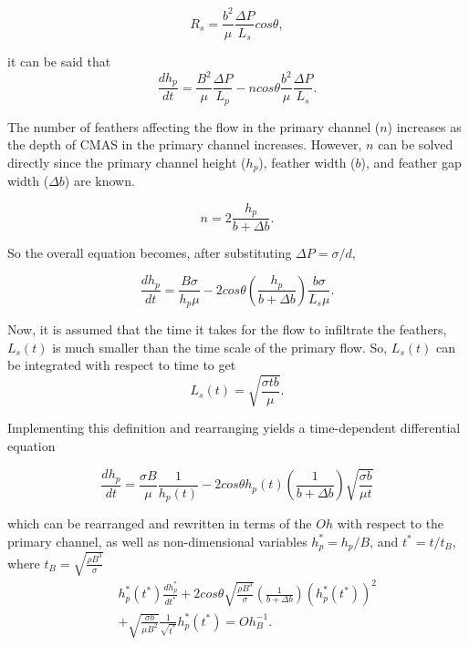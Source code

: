 \documentclass[%
 aip,
 amsmath,amssymb,
 reprint,%
floatfix]{revtex4-1}
\begin{document}
\begin{equation}
    R_{s} = \frac{b^{2}}{\mu}\frac{\Delta P}{L_{s}}cos\theta,
\end{equation}

\noindent it can be said that 
\begin{equation}
        \frac{dh_{p}}{dt} = \frac{B^{2}}{\mu}\frac{\Delta P}{L_{p}} -ncos\theta\frac{b^{2}}{\mu}\frac{\Delta P}{L_{s}}.
\end{equation}

\noindent The number of feathers affecting the flow in the primary channel ($n$) increases as the depth of CMAS in the primary channel increases. However, $n$ can be solved directly since the primary channel height ($h_p$), feather width ($b$), and feather gap width ($\Delta b$) are known.

\begin{equation}
    n = 2\frac{h_{p}}{b + \Delta b}.
\end{equation}

\noindent So the overall equation becomes, after substituting $\Delta P = \sigma/d$,

\begin{equation}
    \frac{dh_{p}}{dt} = \frac{B \sigma}{h_{p}\mu} - 2 cos\theta\left(\frac{h_{p}}{b + \Delta b} \right)\frac{b \sigma}{L_{s}\mu}.
\end{equation}


\noindent Now, it is assumed that the time it takes for the flow to infiltrate the feathers, $L_{s}(t)$ is much smaller than the time scale of the primary flow. So, $L_{s}(t)$ can be integrated with respect to time to get 
\begin{equation}
    L_{s}\left( t \right) = \sqrt{\frac{\sigma t b}{\mu}}.
\end{equation}

\noindent Implementing this definition and rearranging yields a time-dependent differential equation

\begin{equation}
    \frac{dh_{p}}{dt} = \frac{\sigma B}{\mu} \frac{1}{h_{p}(t)} - 2 cos\theta h_{p}(t) \left( \frac{1}{b+\Delta b} \right) \sqrt{\frac{\sigma b}{\mu t}}
    \label{eq:FPNM_dimensional}
\end{equation}

\noindent which can be rearranged and rewritten in terms of the $Oh$ with respect to the primary channel, as well as non-dimensional variables $h_p^* = h_p/B$, and $t^* = t/t_{B}$, where $t_{B} = \sqrt{\frac{\rho B^{3}}{\sigma}}$
\begin{eqnarray}
\label{eq:FPNM_non-dimensional}
    &&h_{p}^{*}\left(t^{*}\right)\frac{dh_{p}^{*}}{dt^{*}} + 2 cos\theta \sqrt{\frac{\rho B^{3}}{\sigma}} \left( \frac{1}{b+\Delta b} \right)\left(h_{p}^{*}\left(t^{*}\right)\right)^{2} \\
    && + \sqrt{\frac{\sigma b}{\mu B^{2}}} \frac{1}{\sqrt{t^{*}}} h_{p}^{*} \left(t^{*}\right) = Oh_{B}^{-1}. \nonumber
\end{eqnarray}
\end{document}
